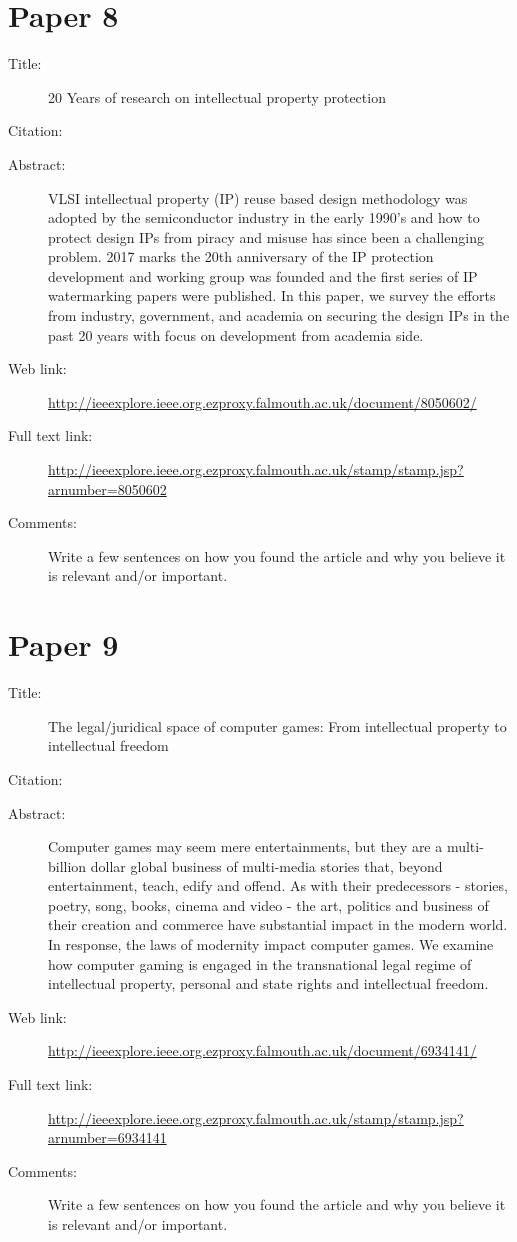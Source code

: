 \documentclass{scrartcl}
\begin{document}
\section*{Paper 8}
\begin{description}
\item[Title:] 20 Years of research on intellectual property protection
\item[Citation:] \cite{20yearsIP}
\item[Abstract:] VLSI intellectual property (IP) reuse based design methodology was adopted by the semiconductor industry in the early 1990's and how to protect design IPs from piracy and misuse has since been a challenging problem. 2017 marks the 20th anniversary of the IP protection development and working group was founded and the first series of IP watermarking papers were published. In this paper, we survey the efforts from industry, government, and academia on securing the design IPs in the past 20 years with focus on development from academia side.
\item[Web link:] \url{http://ieeexplore.ieee.org.ezproxy.falmouth.ac.uk/document/8050602/}
\item[Full text link:] \url{http://ieeexplore.ieee.org.ezproxy.falmouth.ac.uk/stamp/stamp.jsp?arnumber=8050602}
\item[Comments:] Write a few sentences on how you found the article and why you believe it is relevant and/or important.
\end{description}

\section*{Paper 9}
\begin{description}
\item[Title:] The legal/juridical space of computer games: From intellectual property to intellectual freedom
\item[Citation:] \cite{LegalJuridical}
\item[Abstract:] Computer games may seem mere entertainments, but they are a multi-billion dollar global business of multi-media stories that, beyond entertainment, teach, edify and offend. As with their predecessors - stories, poetry, song, books, cinema and video - the art, politics and business of their creation and commerce have substantial impact in the modern world. In response, the laws of modernity impact computer games. We examine how computer gaming is engaged in the transnational legal regime of intellectual property, personal and state rights and intellectual freedom.
\item[Web link:] \url{http://ieeexplore.ieee.org.ezproxy.falmouth.ac.uk/document/6934141/}
\item[Full text link:] \url{http://ieeexplore.ieee.org.ezproxy.falmouth.ac.uk/stamp/stamp.jsp?arnumber=6934141}
\item[Comments:] Write a few sentences on how you found the article and why you believe it is relevant and/or important.
\end{description}
\end{document}
